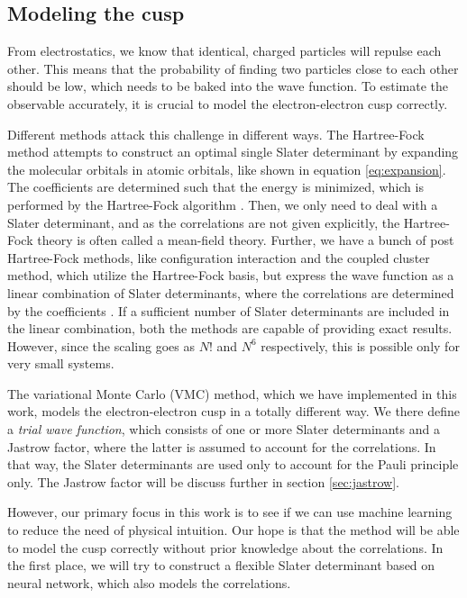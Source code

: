 \subsection{Modeling the cusp} \label{sec:cusp}
From electrostatics, we know that identical, charged particles will repulse each other. This means that the probability of finding two particles close to each other should be low, which needs to be baked into the wave function. To estimate the observable accurately, it is crucial to model the electron-electron cusp correctly.

Different methods attack this challenge in different ways. The Hartree-Fock method attempts to construct an optimal single Slater determinant by expanding the molecular orbitals in atomic orbitals, like shown in equation \eqref{eq:expansion}. The coefficients are determined such that the energy is minimized, which is performed by the Hartree-Fock algorithm \cite{hartree_wave_1928, fock_selfconsistent_1930}. Then, we only need to deal with a Slater determinant, and as the correlations are not given explicitly, the Hartree-Fock theory is often called a mean-field theory. Further, we have a bunch of post Hartree-Fock methods, like configuration interaction and the coupled cluster method, which utilize the Hartree-Fock basis, but express the wave function as a linear combination of Slater determinants, where the correlations are determined by the coefficients \cite{daniel_crawford_introduction_2007}. If a sufficient number of Slater determinants are included in the linear combination, both the methods are capable of providing exact results. However, since the scaling goes as $N!$ and $N^6$ respectively, this is possible only for very small systems.

The variational Monte Carlo (VMC) method, which we have implemented in this work, models the electron-electron cusp in a totally different way. We there define a \textit{trial wave function}, which consists of one or more Slater determinants and a Jastrow factor, where the latter is assumed to account for the correlations. In that way, the Slater determinants are used only to account for the Pauli principle only. The Jastrow factor will be discuss further in section \ref{sec:jastrow}.

However, our primary focus in this work is to see if we can use machine learning to reduce the need of physical intuition. Our hope is that the method will be able to model the cusp correctly without prior knowledge about the correlations. In the first place, we will try to construct a flexible Slater determinant based on neural network, which also models the correlations.

